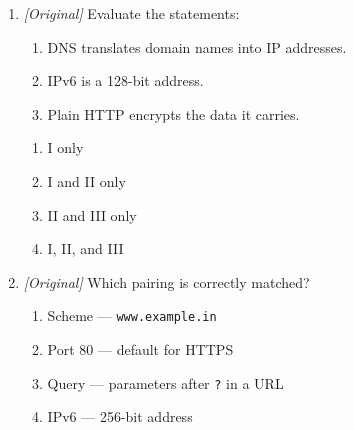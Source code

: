 \begin{enumerate}[label=\textbf{Q\arabic*.}, leftmargin=*]
\begin{enumerate}[label=\Alph*.]
      $\rightarrow$ TLS handshake $\rightarrow$ page.
    \item IP $\rightarrow$ URL $\rightarrow$ DNS $\rightarrow$ TLS handshake
      $\rightarrow$ server $\rightarrow$ page.
    \item URL $\rightarrow$ IP $\rightarrow$ page $\rightarrow$ DNS
      $\rightarrow$ server $\rightarrow$ TLS handshake.
    \item DNS $\rightarrow$ TLS handshake $\rightarrow$ URL $\rightarrow$ IP
      $\rightarrow$ page $\rightarrow$ server.
  \end{enumerate}
\item \textit{[Original]} Evaluate the statements:
  \begin{enumerate}[label=\Roman*.]
    \item DNS translates domain names into IP addresses.
    \item IPv6 is a 128-bit address.
    \item Plain HTTP encrypts the data it carries.
  \end{enumerate}
  \begin{enumerate}[label=\Alph*.]
    \item I only
    \item I and II only
    \item II and III only
    \item I, II, and III
  \end{enumerate}
\item \textit{[Original]} Which pairing is correctly matched?
  \begin{enumerate}[label=\Alph*.]
    \item Scheme --- \texttt{www.example.in}
    \item Port 80 --- default for HTTPS
    \item Query --- parameters after \texttt{?} in a URL
    \item IPv6 --- 256-bit address
  \end{enumerate}


\end{enumerate}
